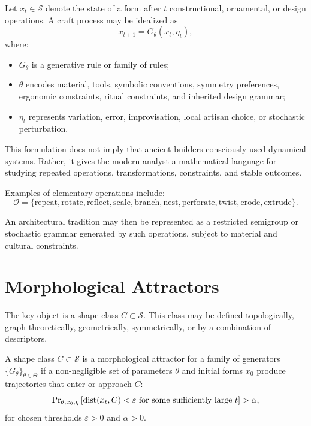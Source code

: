 Let $x_t \in \mathcal{S}$ denote the state of a form after $t$ constructional, ornamental, or design operations. A craft process may be idealized as
\begin{equation}
    x_{t+1}=G_{\theta}(x_t,\eta_t),
\end{equation}
where:
\begin{itemize}
    \item $G_{\theta}$ is a generative rule or family of rules;
    \item $\theta$ encodes material, tools, symbolic conventions, symmetry preferences, ergonomic constraints, ritual constraints, and inherited design grammar;
    \item $\eta_t$ represents variation, error, improvisation, local artisan choice, or stochastic perturbation.
\end{itemize}

This formulation does not imply that ancient builders consciously used dynamical systems. Rather, it gives the modern analyst a mathematical language for studying repeated operations, transformations, constraints, and stable outcomes.

Examples of elementary operations include:
\begin{equation}
    \mathcal{O}=\{\text{repeat},\text{rotate},\text{reflect},\text{scale},\text{branch},\text{nest},\text{perforate},\text{twist},\text{erode},\text{extrude}\}.
\end{equation}

An architectural tradition may then be represented as a restricted semigroup or stochastic grammar generated by such operations, subject to material and cultural constraints.

\section{Morphological Attractors}

The key object is a shape class $C \subset \mathcal{S}$. This class may be defined topologically, graph-theoretically, geometrically, symmetrically, or by a combination of descriptors.

\begin{definition}
A shape class $C \subset \mathcal{S}$ is a morphological attractor for a family of generators $\{G_{\theta}\}_{\theta \in \Theta}$ if a non-negligible set of parameters $\theta$ and initial forms $x_0$ produce trajectories that enter or approach $C$:
\begin{equation}
    \operatorname{Pr}_{\theta,x_0,\eta}\left[\operatorname{dist}(x_t,C)<\varepsilon \text{ for some sufficiently large } t\right] > \alpha,
\end{equation}
for chosen thresholds $\varepsilon>0$ and $\alpha>0$.
\end{definition}

